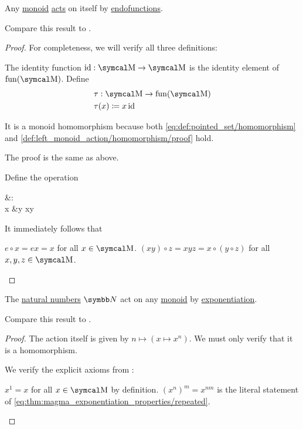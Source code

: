 \begin{proposition}\label{thm:monoid_is_action}
  Any \hyperref[def:unital_magma/associative]{monoid} \hyperref[def:left_monoid_action]{acts} on itself by \hyperref[def:endofunction]{endofunctions}.

  Compare this result to .
\end{proposition}
\begin{proof}
  For completeness, we will verify all three definitions:

   The identity function \( \Id: \CM \to \CM \) is the identity element of \( \Fun(\CM) \). Define
  \begin{align*}
    &\tau: \CM \to \Fun(\CM) \\
    &\tau(x) \coloneqq x \Id
  \end{align*}

  It is a monoid homomorphism because both \eqref{eq:def:pointed_set/homomorphism} and \eqref{def:left_monoid_action/homomorphism/proof} hold.

   The proof is the same as above.

   Define the operation
  \begin{BreakableAlign*}
    {}&\odot{}: \CM \times \CM \to \CM \\
    x &\odot y \coloneqq xy
  \end{BreakableAlign*}

  It immediately follows that
  \begin{RefList}
     \( e \circ x = ex = x \) for all \( x \in \CM \).
     \( (x y) \circ z = xyz = x \circ (y \circ z) \) for all \( x, y, z \in \CM \).
  \end{RefList}
\end{proof}

\begin{proposition}\label{thm:natural_numbers_monoid_action}
  The \hyperref[def:natural_numbers]{natural numbers} \( \BN \) act on any \hyperref[def:unital_magma/associative]{monoid} by \hyperref[def:unital_magma/exponentiation]{exponentiation}.

  Compare this result to .
\end{proposition}
\begin{proof}
  The action itself is given by \( n \mapsto (x \mapsto x^n) \). We must only verify that it is a homomorphism.

  We verify the explicit axioms from :
  \begin{RefList}
     \( x^1 = x \) for all \( x \in \CM \) by definition.
     \( (x^n)^m = x^{nm} \) is the literal statement of \eqref{eq:thm:magma_exponentiation_properties/repeated}.
  \end{RefList}
\end{proof}
